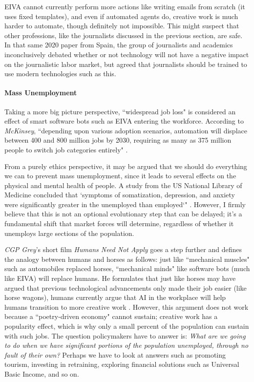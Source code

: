 \documentclass{article}
\begin{document}
EIVA cannot currently perform more actions like writing emails from scratch (it uses fixed templates), and even if automated agents do, creative work is much harder to automate, though definitely not impossible. This might suspect that other professions, like the journalists discussed in the previous section, are safe. In that same 2020 paper from Spain, the group of journalists and academics inconclusively debated whether or not technology will not have a negative impact on the journalistic labor market, but agreed that journalists should be trained to use modern technologies such as this.

\paragraph{Mass Unemployment}

Taking a more big picture perspective, ``widespread job loss" is considered an effect of smart software bots such as EIVA entering the workforce. According to \emph{McKinsey}, ``depending upon various adoption scenarios, automation will displace between 400 and 800 million jobs by 2030, requiring as many as 375 million people to switch job categories entirely" \cite{noauthor_impact_2020}.

From a purely ethics perspective, it may be argued that we should do everything we can to prevent mass unemployment, since it leads to several effects on the physical and mental health of people. A study from the US National Library of Medicine concluded that `symptoms of somatization, depression, and anxiety were significantly greater in the unemployed than employed`" \cite{linn_effects_1985}. However, I firmly believe that this is not an optional evolutionary step that can be delayed; it's a fundamental shift that market forces will determine, regardless of whether it unemploys large sections of the population.

\emph{CGP Grey}'s short film \emph{Humans Need Not Apply} goes a step further and defines the analogy between humans and horses as follows: just like ``mechanical muscles" such as automobiles replaced horses, ``mechanical minds" like software bots (much like EIVA) will replace humans. He formulates that just like horses may have argued that previous technological advancements only made their job easier (like horse wagons), humans currently argue that AI in the workplace will help humans transition to more creative work \cite{noauthor_youtube_nodate}. However, this argument does not work because a ``poetry-driven economy" cannot sustain; creative work has a popularity effect, which is why only a small percent of the population can sustain with such jobs. The question policymakers have to answer is: \emph{What are we going to do when we have significant portions of the population unemployed, through no fault of their own?} Perhaps we have to look at answers such as promoting tourism, investing in retraining, exploring financial solutions such as Universal Basic Income, and so on.
\end{document}
